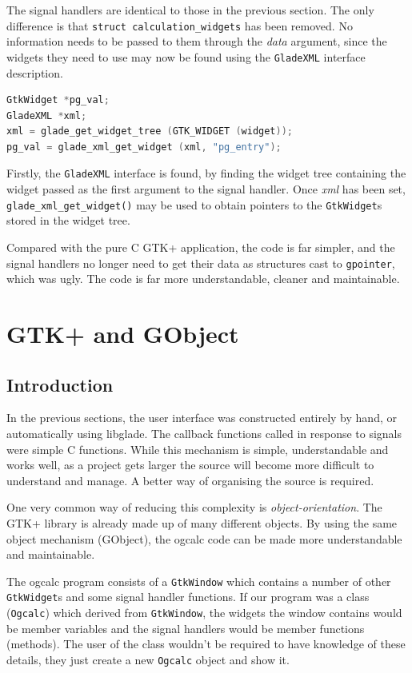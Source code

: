 \documentclass[a4paper,oneside]{article}
\newcommand{\variable}[1]{\textsl{#1}}
\newcommand{\class}[1]{\texttt{#1}}
\newcommand{\function}[1]{\texttt{#1()}}
\newcommand{\type}[1]{\texttt{#1}}
\begin{document}
The signal handlers are identical to those in the previous section.
The only difference is that \type{struct calculation\_widgets} has been
removed.  No information needs to be passed to them through the
\variable{data} argument, since the widgets they need to use may now
be found using the \class{GladeXML} interface description.

\begin{lstlisting}[numbers=none, language=C]
GtkWidget *pg_val;
GladeXML *xml;
xml = glade_get_widget_tree (GTK_WIDGET (widget));
pg_val = glade_xml_get_widget (xml, "pg_entry");
\end{lstlisting}

Firstly, the \class{GladeXML} interface is found, by finding the
widget tree containing the widget passed as the first argument to the
signal handler.  Once \variable{xml} has been set,
\function{glade\_xml\_get\_widget} may be used to obtain pointers to
the \class{GtkWidget}s stored in the widget tree.

Compared with the pure C GTK+ application, the code is far simpler,
and the signal handlers no longer need to get their data as structures
cast to \type{gpointer}, which was ugly.  The code is far more
understandable, cleaner and maintainable.


\section{GTK+ and GObject}

\label{sec:gobject}

\subsection{Introduction}

In the previous sections, the user interface was constructed entirely
by hand, or automatically using libglade.  The callback functions
called in response to signals were simple C functions.  While this
mechanism is simple, understandable and works well, as a project gets
larger the source will become more difficult to understand and manage.
A better way of organising the source is required.

One very common way of reducing this complexity is
\emph{object-orientation}.  The GTK+ library is already made up of
many different objects.  By using the same object mechanism (GObject),
the ogcalc code can be made more understandable and maintainable.

The ogcalc program consists of a \class{GtkWindow} which contains a
number of other \class{GtkWidget}s and some signal handler functions.
If our program was a class (\class{Ogcalc}) which derived from
\class{GtkWindow}, the widgets the window contains would be member
variables and the signal handlers would be member functions (methods).
The user of the class wouldn't be required to have knowledge of these
details, they just create a new \class{Ogcalc} object and show it.
\end{document}
